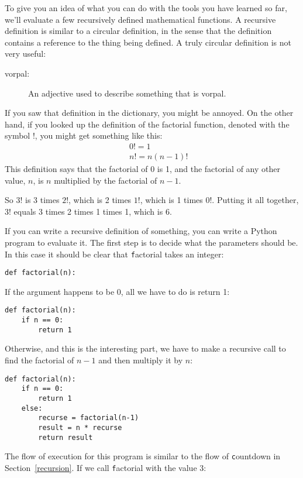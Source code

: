 \documentclass[
DIV=11,
fontsize=13,
twoside,
headinclude=false,
titlepage=firstiscover,
abstract=true,
headsepline=true,
footsepline=true,
chapterprefix=true, %
headings=big,
bibliography=totoc,%
captions=tableheading
]{scrbook}
\theoremstyle{definition}
\begin{document}
To give you an idea of what you can do with the tools you have learned
so far, we'll evaluate a few recursively defined mathematical
functions.  A recursive definition is similar to a circular
definition, in the sense that the definition contains a reference to
the thing being defined.  A truly circular definition is not very
useful:

\begin{description}

\item[vorpal:] An adjective used to describe something that is vorpal.

\end{description}

If you saw that definition in the dictionary, you might be annoyed. On
the other hand, if you looked up the definition of the factorial
function, denoted with the symbol $!$, you might get something like
this:
%
\begin{eqnarray*}
&&  0! = 1 \\
&&  n! = n (n-1)!
\end{eqnarray*}
%
This definition says that the factorial of 0 is 1, and the factorial
of any other value, $n$, is $n$ multiplied by the factorial of $n-1$.

So $3!$ is 3 times $2!$, which is 2 times $1!$, which is 1 times
$0!$. Putting it all together, $3!$ equals 3 times 2 times 1 times 1,
which is 6.

If you can write a recursive definition of something, you can
write a Python program to evaluate it. The first step is to decide
what the parameters should be.  In this case it should be clear
that {\texttt factorial} takes an integer:

\begin{lstlisting}
def factorial(n):
\end{lstlisting}
%
If the argument happens to be 0, all we have to do is return 1:

\begin{lstlisting}
def factorial(n):
    if n == 0:
        return 1
\end{lstlisting}
%
Otherwise, and this is the interesting part, we have to make a
recursive call to find the factorial of $n-1$ and then multiply it by
$n$:

\begin{lstlisting}
def factorial(n):
    if n == 0:
        return 1
    else:
        recurse = factorial(n-1)
        result = n * recurse
        return result
\end{lstlisting}
%
The flow of execution for this program is similar to the flow of {\texttt
countdown} in Section~\ref{recursion}.  If we call {\texttt factorial}
with the value 3:
\end{document}
